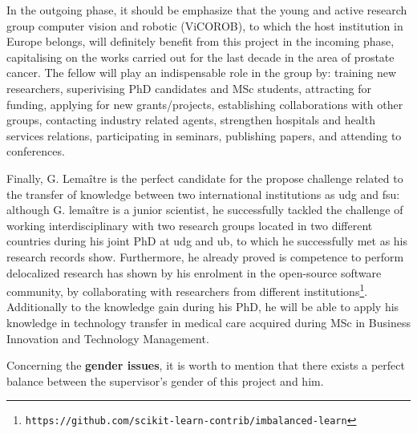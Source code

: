 In the outgoing phase, it should be emphasize that the young and active research group computer vision and robotic (ViCOROB), to which the host institution in Europe belongs, will definitely benefit from this project in the incoming phase, capitalising on the works carried out for the last decade in the area of prostate cancer. The fellow will play an indispensable role in the group by: training new researchers, superivising PhD candidates and MSc students, attracting for funding, applying for new grants/projects,  establishing collaborations with other groups, contacting industry related agents, strengthen hospitals and health services relations, participating in seminars, publishing papers, and attending to conferences.

Finally, G. Lema\^itre is the perfect candidate for the propose challenge related to the transfer of knowledge between two international institutions as \ac{udg} and \ac{fsu}: although G. lema\^itre is a junior scientist, he successfully tackled the challenge of working interdisciplinary with two research groups located in two different countries during his joint PhD at \ac{udg} and \ac{ub}, to which he successfully met as his research records show.
Furthermore, he already proved is competence to perform delocalized research has shown by his enrolment in the open-source software community, by collaborating with researchers from different institutions\footnote{\texttt{https://github.com/scikit-learn-contrib/imbalanced-learn}}.
Additionally to the knowledge gain during his PhD, he will be able to apply his knowledge in technology transfer in medical care acquired during MSc in Business Innovation and Technology Management.

Concerning the \textbf{gender issues}, it is worth to mention that there exists a perfect balance between the supervisor's gender of this project and him.



